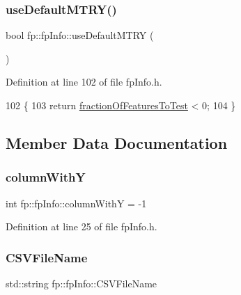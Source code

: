 \subsubsection{\texorpdfstring{use\+Default\+M\+T\+R\+Y()}{useDefaultMTRY()}}
{\footnotesize\ttfamily bool fp\+::fp\+Info\+::use\+Default\+M\+T\+RY (\begin{DoxyParamCaption}{ }\end{DoxyParamCaption})\hspace{0.3cm}{\ttfamily [inline]}}



Definition at line 102 of file fp\+Info.\+h.


\begin{DoxyCode}
102                                         \{
103                 \textcolor{keywordflow}{return} \hyperlink{classfp_1_1fpInfo_ab949cb97523283367e9b120fd78e3c3b}{fractionOfFeaturesToTest} < 0;
104             \}
\end{DoxyCode}


\subsection{Member Data Documentation}
\mbox{\label{classfp_1_1fpInfo_ac29e135cd84cdef547b678e7ea37f92d}} 
\subsubsection{\texorpdfstring{column\+WithY}{columnWithY}}
{\footnotesize\ttfamily int fp\+::fp\+Info\+::column\+WithY = -\/1\hspace{0.3cm}{\ttfamily [protected]}}



Definition at line 25 of file fp\+Info.\+h.

\mbox{\label{classfp_1_1fpInfo_aac01e5ddb27bc333e172a0422066af1c}} 
\subsubsection{\texorpdfstring{C\+S\+V\+File\+Name}{CSVFileName}}
{\footnotesize\ttfamily std\+::string fp\+::fp\+Info\+::\+C\+S\+V\+File\+Name\hspace{0.3cm}{\ttfamily [protected]}}



